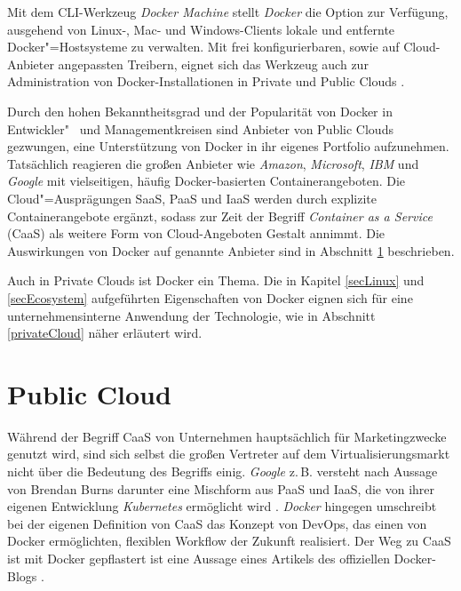 \documentclass[../main.tex]{subfiles}
\begin{document}
  Mit dem CLI-Werkzeug \emph{Docker Machine} stellt \emph{Docker} die Option zur Verfügung, ausgehend von Linux-, Mac- und Windows-Clients lokale und entfernte Docker"=Hostsysteme zu verwalten. Mit frei konfigurierbaren, sowie auf Cloud-Anbieter angepassten Treibern, eignet sich das Werkzeug auch zur Administration von Docker-Installationen in Private und Public Clouds \cite{dockerMachineOverview}\cite{dockerMachineDriverGeneric}\cite{dockerMachineOverviewCloud}.

  Durch den hohen Bekanntheitsgrad und der Popularität von Docker in Ent\-wick\-ler"~ und Managementkreisen sind Anbieter von Public Clouds gezwungen, eine Unterstützung von Docker in ihr eigenes Portfolio aufzunehmen. Tatsächlich reagieren die großen Anbieter wie \emph{Amazon}, \emph{Microsoft}, \emph{IBM} und \emph{Google} mit vielseitigen, häufig Docker-basierten Containerangeboten. Die Cloud"=Ausprägungen \acrshort{SaaS}, \acrshort{PaaS} und \acrshort{IaaS} werden durch explizite Containerangebote ergänzt, sodass zur Zeit der Begriff \emph{Container as a Service} (\acrshort{CaaS}) als weitere Form von Cloud-Angeboten Gestalt annimmt. Die Auswirkungen von Docker auf genannte Anbieter sind in Abschnitt \ref{publicCloud} beschrieben.

  Auch in Private Clouds ist Docker ein Thema. Die in Kapitel \ref{secLinux} und \ref{secEcosystem} aufgeführten Eigenschaften von Docker eignen sich für eine unternehmensinterne Anwendung der Technologie, wie in Abschnitt \ref{privateCloud} näher erläutert wird.


  \section{Public Cloud}
  \label{publicCloud}
    Während der Begriff \acrshort{CaaS} von Unternehmen hauptsächlich für Marketingzwecke genutzt wird, sind sich selbst die großen Vertreter auf dem Virtualisierungsmarkt nicht über die Bedeutung des Begriffs einig. \emph{Google} z.\,B. versteht nach Aussage von Brendan Burns darunter eine Mischform aus PaaS und IaaS, die von ihrer eigenen Entwicklung \emph{Kubernetes} ermöglicht wird \cite[S.12]{slideshareContainerKubernetes}.
    \emph{Docker} hingegen umschreibt bei der eigenen Definition von CaaS das Konzept von DevOps, das einen von Docker ermöglichten, flexiblen Workflow der Zukunft realisiert. \glqq{}Der Weg zu CaaS ist mit Docker gepflastert\grqq{} ist eine Aussage eines Artikels des offiziellen Docker-Blogs \cite{dockerCAAS}.
\end{document}
